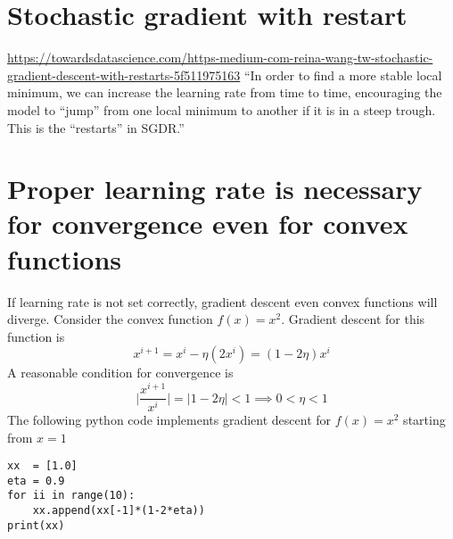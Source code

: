 \documentclass{article}
\newcommand{\beq}{\begin{equation}}
\newcommand{\eeq}{\end{equation}}
\begin{document}
\section{Stochastic gradient with restart}
\url{https://towardsdatascience.com/https-medium-com-reina-wang-tw-stochastic-gradient-descent-with-restarts-5f511975163}
``In order to find a more stable local minimum, we can increase the learning rate from time to time, encouraging the model to “jump” from one local minimum to another if it is in a steep trough. This is the “restarts” in SGDR.''
%
%
%
\section{Proper learning rate is necessary for convergence even for convex functions}
If learning rate is not set correctly, gradient descent even convex functions will diverge. Consider the convex function $f(x)=x^2$. Gradient descent for this function is
\beq
x^{i+1} = x^{i} - \eta(2x^{i}) = (1-2\eta)x^{i}
\eeq
A reasonable condition for convergence is
\beq
\Big|\frac{x^{i+1}}{x^{i}}\Big| = |1-2\eta| < 1 \implies 0 < \eta < 1
\eeq
The following python code implements gradient descent for $f(x)=x^2$ starting from $x=1$
\begin{verbatim}
xx  = [1.0]
eta = 0.9
for ii in range(10):
    xx.append(xx[-1]*(1-2*eta))
print(xx)
\end{verbatim}
\end{document}
